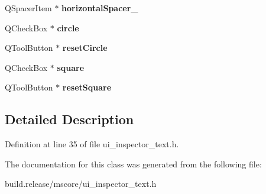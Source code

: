 \begin{DoxyCompactItemize}
Q\+Spacer\+Item $\ast$ {\bfseries horizontal\+Spacer\+\_}
\item 
\mbox{\label{class_ui___inspector_text_a8e2b7122be9836b86985f7f774a550a9}} 
Q\+Check\+Box $\ast$ {\bfseries circle}
\item 
\mbox{\label{class_ui___inspector_text_a723b7b35740416e82f8eb5fa469f6dc2}} 
Q\+Tool\+Button $\ast$ {\bfseries reset\+Circle}
\item 
\mbox{\label{class_ui___inspector_text_a9f2bd22c11279271f688c1d3bb21dd08}} 
Q\+Check\+Box $\ast$ {\bfseries square}
\item 
\mbox{\label{class_ui___inspector_text_a2c89ffc96b412d87562a2a52aba80b54}} 
Q\+Tool\+Button $\ast$ {\bfseries reset\+Square}
\end{DoxyCompactItemize}


\subsection{Detailed Description}


Definition at line 35 of file ui\+\_\+inspector\+\_\+text.\+h.



The documentation for this class was generated from the following file\+:\begin{DoxyCompactItemize}
\item 
build.\+release/mscore/ui\+\_\+inspector\+\_\+text.\+h\end{DoxyCompactItemize}
